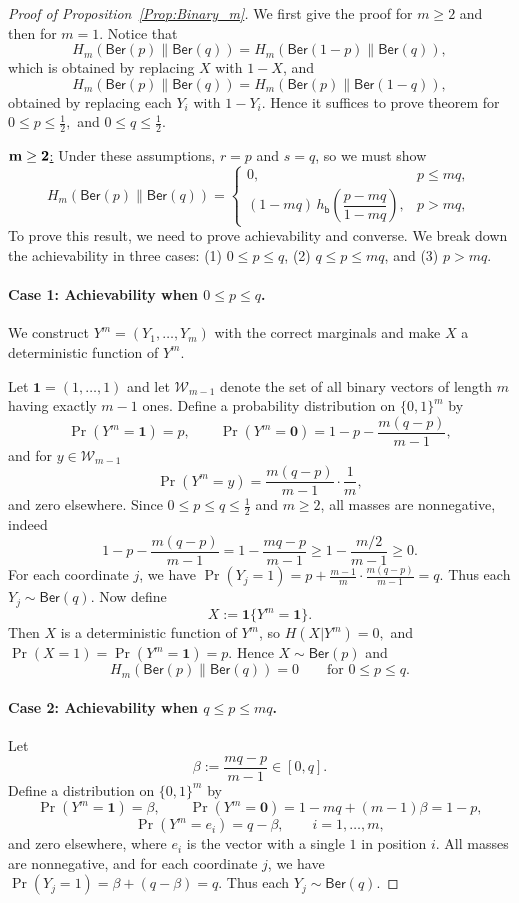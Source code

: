 \documentclass[10pt,a4paper]{amsart}
\newcommand{\Ber}{\mathsf{Ber}}
\begin{document}
\begin{proof}[Proof of Proposition~\ref{Prop:Binary_m}]
We first give the proof for $m\geq 2$ and then for $m=1$. 
Notice that  
\[H_m(\Ber(p)\|\Ber(q)) =H_m(\Ber(1-p)\|\Ber(q)),\]
which is obtained by replacing $X$ with $1-X$, and
\[H_m(\Ber(p)\|\Ber(q))=H_m(\Ber(p)\|\Ber(1-q)),\]
obtained by replacing each $Y_i$ with $1-Y_i$. Hence it suffices to prove theorem for \(0\le p\le \tfrac12,\) and \(0\le q\le \tfrac12.\)



\noindent\underline{$\bf m\geq 2$:}
Under these assumptions, $r=p$ and $s=q$, so we must show
\[H_m(\Ber(p)\|\Ber(q))=\begin{cases}
0, & p\le mq,\\[1ex]
(1-mq)\,h_{\mathsf{b}}\!\left(\dfrac{p-mq}{1-mq}\right), & p>mq,
\end{cases}\]
To prove this result, we need to prove achievability and converse. We break down the achievability in three cases: (1) $0\le p\le q$, (2) $q\leq  p\le mq$, and (3) $p> mq$.

\paragraph{Case 1: Achievability when $0\le p\le q$.}
We construct $Y^m=(Y_1,\dots,Y_m)$ with the correct marginals and make $X$ a deterministic function of $Y^m$.

Let $\mathbf 1=(1,\dots,1)$ and let $\mathcal W_{m-1}$ denote the set of all binary vectors of length $m$ having exactly $m-1$ ones. Define a probability distribution on $\{0,1\}^m$ by
\[\Pr(Y^m=\mathbf 1)=p,\qquad \Pr(Y^m=\mathbf 0)=1-p-\frac{m(q-p)}{m-1},\]
and for $y\in\mathcal W_{m-1}$
\[\Pr(Y^m=y)=\frac{m(q-p)}{m-1}\cdot \frac1m,\]
and zero elsewhere.
Since $0\le p\le q\le \frac12$ and $m\ge 2$, all masses are nonnegative, indeed
\[1-p-\frac{m(q-p)}{m-1}=1-\frac{mq-p}{m-1} \ge 1-\frac{m/2}{m-1}\ge 0.\]
For each coordinate $j$, we have \(\Pr(Y_j=1)=p+\frac{m-1}{m}\cdot \frac{m(q-p)}{m-1}=q.\) Thus each $Y_j\sim \Ber(q)$.
Now define
\[X:=\mathbf 1\{Y^m=\mathbf 1\}.\]
Then $X$ is a deterministic function of $Y^m$, so \(H(X| Y^m)=0,\)
and \(\Pr(X=1)=\Pr(Y^m=\mathbf 1)=p.\)
Hence $X\sim\Ber(p)$ and
\[H_m(\Ber(p)\|\Ber(q))=0\qquad\text{for }0\le p\le q.\]

\paragraph{Case 2: Achievability when $q\le p\le mq$.}
Let
\[\beta:=\frac{mq-p}{m-1}\in[0,q].\]
Define a distribution on $\{0,1\}^m$ by
\[\Pr(Y^m=\mathbf 1)=\beta,\qquad \Pr(Y^m=\mathbf 0)=1-mq+(m-1)\beta=1-p,\]
\[\Pr(Y^m=e_i)=q-\beta,\qquad i=1,\dots,m,\]
and zero elsewhere, where $e_i$ is the vector with a single $1$ in position $i$.
All masses are nonnegative, and for each coordinate $j$, we have \(\Pr(Y_j=1)=\beta+(q-\beta)=q.\) Thus each $Y_j\sim\Ber(q)$.


\end{proof}
\end{document}
